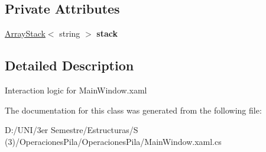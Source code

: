 \subsection*{Private Attributes}
\begin{DoxyCompactItemize}
\item 
\mbox{\label{class_operaciones_pila_1_1_main_window_ac213011bd9e1929a3a7d586d243b5e37}} 
\hyperlink{class_operaciones_pila_1_1_array_stack}{Array\+Stack}$<$ string $>$ {\bfseries stack}
\end{DoxyCompactItemize}


\subsection{Detailed Description}
Interaction logic for Main\+Window.\+xaml 



The documentation for this class was generated from the following file\+:\begin{DoxyCompactItemize}
\item 
D\+:/\+U\+N\+I/3er Semestre/\+Estructuras/\+S (3)/\+Operaciones\+Pila/\+Operaciones\+Pila/Main\+Window.\+xaml.\+cs\end{DoxyCompactItemize}
